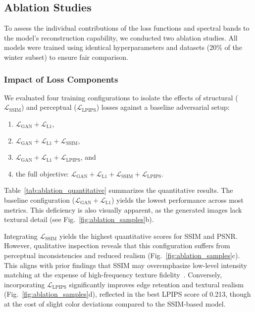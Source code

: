 \subsection{Ablation Studies}
\label{abl:loss}

To assess the individual contributions of the loss functions and spectral bands to the model's reconstruction capability, we conducted two ablation studies. All models were trained using identical hyperparameters and datasets (20\% of the winter subset) to ensure fair comparison.

\subsubsection{Impact of Loss Components}
\label{subsec:ablation_loss}

We evaluated four training configurations to isolate the effects of structural ($\mathcal{L}_{\text{SSIM}}$) and perceptual ($\mathcal{L}_{\text{LPIPS}}$) losses against a baseline adversarial setup:
\begin{enumerate}
    \item $\mathcal{L}_{\text{GAN}} + \mathcal{L}_{\text{L1}}$,
    \item $\mathcal{L}_{\text{GAN}} + \mathcal{L}_{\text{L1}} + \mathcal{L}_{\text{SSIM}}$,
    \item $\mathcal{L}_{\text{GAN}} + \mathcal{L}_{\text{L1}} + \mathcal{L}_{\text{LPIPS}}$, and
    \item the full objective: $\mathcal{L}_{\text{GAN}} + \mathcal{L}_{\text{L1}} + \mathcal{L}_{\text{SSIM}} + \mathcal{L}_{\text{LPIPS}}$.
\end{enumerate}

Table~\ref{tab:ablation_quantitative} summarizes the quantitative results. The baseline configuration ($\mathcal{L}_{\text{GAN}} + \mathcal{L}_{\text{L1}}$) yields the lowest performance across most metrics. This deficiency is also visually apparent, as the generated images lack textural detail (see Fig.~\ref{fig:ablation_samples}b).

Integrating $\mathcal{L}_{\text{SSIM}}$ yields the highest quantitative scores for SSIM and PSNR. However, qualitative inspection reveals that this configuration suffers from perceptual inconsistencies and reduced realism (Fig.~\ref{fig:ablation_samples}c). This aligns with prior findings that SSIM may overemphasize low-level intensity matching at the expense of high-frequency texture fidelity~\cite{nvidia_Understanding_SSIM}. Conversely, incorporating $\mathcal{L}_{\text{LPIPS}}$ significantly improves edge retention and textural realism (Fig.~\ref{fig:ablation_samples}d), reflected in the best LPIPS score of 0.213, though at the cost of slight color deviations compared to the SSIM-based model.

